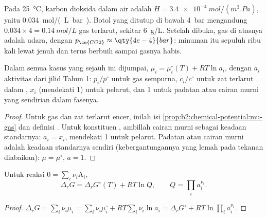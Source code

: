 \begin{example}\label{ex:b2:chemical-potential:soda}
Pada \qty{25}{\celsius},  karbon dioksida dalam air adalah
$H =
\qty{3.4e-4}{mol/(m^3.Pa)}$, yaitu \qty{0.034}{mol/(L.bar)}. Botol
yang ditutup di bawah \qty{4}{bar}  mengandung $0.034 \times 4 =
\qty{0.14}{mol/L}$ gas terlarut, sekitar \qty{6}{g/L}. Setelah dibuka, gas
di atasnya adalah udara, dengan $p_{\ce{CO2}} \approx \qty{4e-4}{bar}$:
minuman itu sepuluh ribu kali lewat jenuh dan terus berbuih sampai
gasnya habis.
\end{example}

\begin{proposition}\label{prop:b2:chemical-potential:activity}
Dalam semua kasus yang sejauh ini dijumpai, $\mu_i = \mu_i^\circ(T) + RT\ln a_i$, dengan $a_i$ aktivitas dari jilid Tahun 1: $p_i/p^\circ$ untuk
gas sempurna, $c_i/c^\circ$ untuk zat terlarut dalam ,
$x_i$ (mendekati 1) untuk pelarut, dan 1 untuk padatan atau cairan murni
yang sendirian dalam fasenya.
\end{proposition}

\begin{proof}
Untuk gas dan zat terlarut encer, inilah isi
\cref{prop:b2:chemical-potential:mu-gas} dan definisi . Untuk konstituen , ambillah cairan murni sebagai
keadaan standarnya: $a_i = x_i$, mendekati 1 untuk pelarut. Padatan atau
cairan murni adalah keadaan standarnya sendiri (kebergantungannya yang
lemah pada tekanan diabaikan): $\mu = \mu^\circ$, $a = 1$.
\end{proof}

\begin{proposition}\label{prop:b2:chemical-potential:delta-g-q}
Untuk reaksi $0 = \sum_i\nu_i\mathrm A_i$,
\[
  \Delta_r G = \Delta_r G^\circ(T) + RT\ln Q, \qquad Q = \prod_i a_i^{\nu_i} .
\]
\end{proposition}

\begin{proof}
$\Delta_r G = \sum_i\nu_i\mu_i = \sum_i\nu_i\mu_i^\circ + RT\sum_i\nu_i\ln a_i =
\Delta_r G^\circ + RT\ln\prod_i a_i^{\nu_i}$.
\end{proof}

